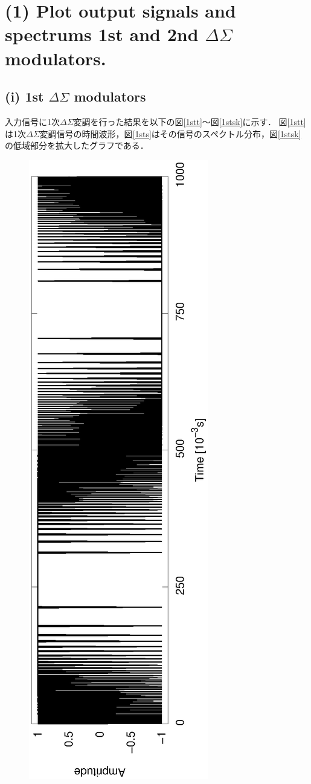 \documentclass[a4j]{jsarticle}
\begin{document}
\section*{(1) Plot output signals and spectrums 1st and 2nd $\Delta\Sigma$ modulators.}
%
\subsection*{(i) 1st $\Delta\Sigma$ modulators}
入力信号に1次$\Delta\Sigma$変調を行った結果を以下の図\ref{1stt}〜図\ref{1stsk}に示す．
図\ref{1stt}は1次$\Delta\Sigma$変調信号の時間波形，図\ref{1sts}はその信号のスペクトル分布，図\ref{1stsk}の低域部分を拡大したグラフである．

\begin{figure}[H]
 \centering
 \vspace{-3.5cm}
 \hspace{-2cm}
 \includegraphics[angle=-90,scale=0.6]{1stout_time.eps}

\end{figure}
\end{document}
